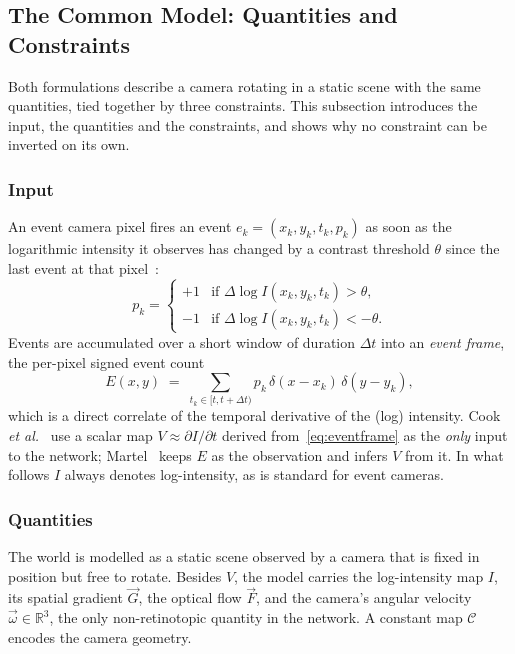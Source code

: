 \documentclass[journal]{IEEEtran}
\newcommand{\Imap}{I}
\newcommand{\Vmap}{V}
\newcommand{\Gmap}{\vec{G}}
\newcommand{\Fmap}{\vec{F}}
\newcommand{\Cmat}{\mathcal{C}}
\newcommand{\wvec}{\vec{\omega}}
\begin{document}
\subsection{The Common Model: Quantities and Constraints}
\label{sec:model}
Both formulations describe a camera rotating in a static scene with the same quantities, tied together by three constraints. This subsection introduces the input, the quantities and the constraints, and shows why no constraint can be inverted on its own.

\subsubsection{Input}
An event camera pixel fires an event $e_k=(x_k,y_k,t_k,p_k)$ as soon as the logarithmic intensity it observes has changed by a contrast threshold $\theta$ since the last event at that pixel~\cite{lichtsteiner2008}:
\begin{equation}
p_k = \begin{cases}
+1 & \text{if } \Delta \log \Imap(x_k,y_k,t_k) > \theta,\\
-1 & \text{if } \Delta \log \Imap(x_k,y_k,t_k) < -\theta .
\end{cases}
\end{equation}
Events are accumulated over a short window of duration $\Delta t$ into an \emph{event frame}, the per-pixel signed event count
\begin{equation}
E(x,y) \;=\; \sum_{t_k \in [t, t+\Delta t)} p_k \, \delta(x-x_k)\,\delta(y-y_k),
\label{eq:eventframe}
\end{equation}
which is a direct correlate of the temporal derivative of the (log) intensity.
Cook \emph{et al.}~\cite{cook2011} use a scalar map $\Vmap \approx \partial \Imap/\partial t$ derived from~\eqref{eq:eventframe} as the \emph{only} input to the network;
Martel~\cite{martel2015relational,martel2019thesis} keeps $E$ as the observation and infers $\Vmap$ from it. In what follows $\Imap$ always denotes log-intensity, as is standard for event cameras.

\subsubsection{Quantities}
The world is modelled as a static scene observed by a camera that is fixed in position but free to rotate. Besides $\Vmap$, the model carries the log-intensity map $\Imap$, its spatial gradient $\Gmap$, the optical flow $\Fmap$, and the camera's angular velocity $\wvec\in\mathbb{R}^3$, the only non-retinotopic quantity in the network. A constant map $\Cmat$ encodes the camera geometry.
\end{document}

